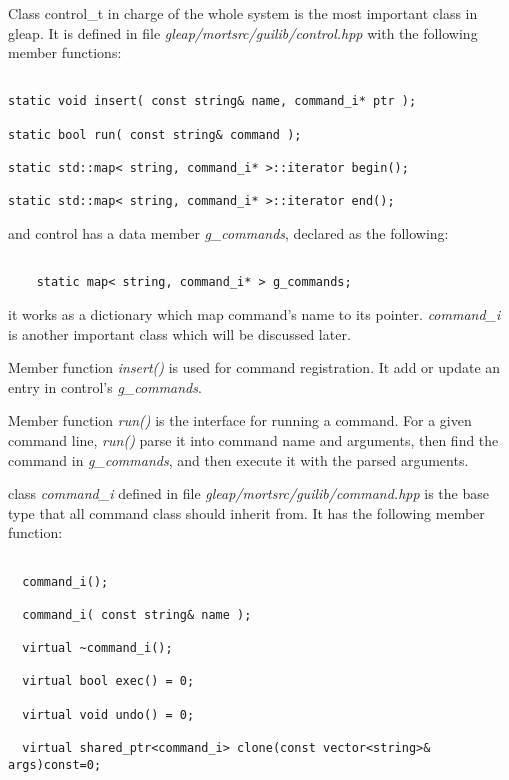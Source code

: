 \documentclass[letterpaper]{book}
\begin{document}
Class control\_t in charge of the whole system is the most important class in gleap.
It is defined in file {\it gleap/mortsrc/guilib/control.hpp} with the following member
functions:

\begin{lstlisting}

static void insert( const string& name, command_i* ptr );

static bool run( const string& command );

static std::map< string, command_i* >::iterator begin();

static std::map< string, command_i* >::iterator end();

\end{lstlisting}

and control has a data member {\it g\_commands}, declared as the following:

\begin{lstlisting}

    static map< string, command_i* > g_commands;

\end{lstlisting}

it works as a dictionary which map command's name to its pointer. {\it command\_i}
is another important class which will be discussed later.


Member function {\it insert()} is used for command registration. It add or update an 
entry in control's {\it g\_commands}. 


Member function {\it run()} is the interface for running a command. For a given 
command line, {\it run()} parse it into command name and arguments, then find 
the command in {\it g\_commands}, and then execute it with the parsed arguments.


class {\it command\_i} defined in file {\it gleap/mortsrc/guilib/command.hpp} is the base type
that all command class should inherit from. It has the following member function:

\begin{lstlisting}

  command_i();

  command_i( const string& name );

  virtual ~command_i();

  virtual bool exec() = 0;
    
  virtual void undo() = 0;
    
  virtual shared_ptr<command_i> clone(const vector<string>& args)const=0;

\end{lstlisting}
\end{document}
